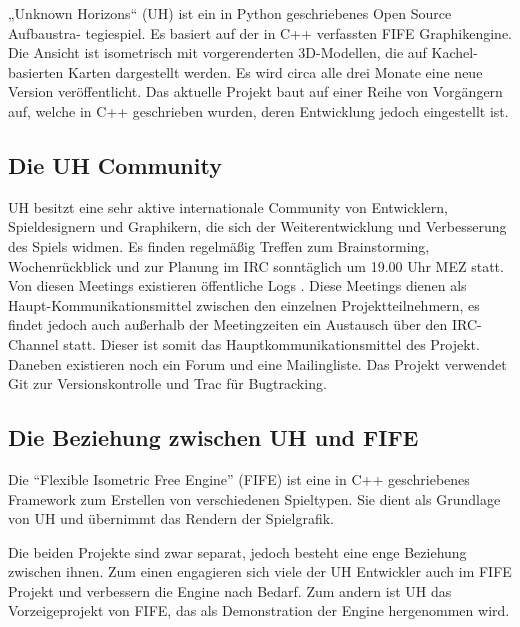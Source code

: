 „Unknown Horizons“ (UH) \cite{uh} ist ein in Python geschriebenes Open Source Aufbaustra-
tegiespiel. Es basiert auf der in C++
verfassten FIFE Graphikengine. Die Ansicht ist isometrisch mit vorgerenderten 3D-Modellen,
die auf Kachel-basierten Karten dargestellt werden. Es wird circa alle drei Monate eine neue Version
veröffentlicht. Das aktuelle Projekt baut auf einer Reihe von Vorgängern auf, welche
in C++ geschrieben wurden, deren Entwicklung jedoch eingestellt ist.

\subsection{Die UH Community}
UH besitzt eine sehr aktive internationale Community von Entwicklern, Spieldesignern und Graphikern, die
sich der Weiterentwicklung und Verbesserung des Spiels widmen.
Es finden regelmäßig Treffen zum Brainstorming, Wochenrückblick
und zur Planung im IRC sonntäglich um 19.00 Uhr MEZ statt. Von diesen Meetings existieren
öffentliche Logs \cite{uhlogs}.
Diese Meetings dienen als Haupt-Kommunikationsmittel zwischen den einzelnen Projektteilnehmern,
es findet jedoch auch außerhalb der Meetingzeiten ein Austausch über den  IRC-Channel statt.
Dieser ist somit das
Hauptkommunikationsmittel des Projekt. Daneben existieren noch ein Forum
und eine Mailingliste. Das Projekt verwendet Git zur Versionskontrolle und Trac für
Bugtracking.

\subsection{Die Beziehung zwischen UH und FIFE}
Die \enquote{Flexible Isometric Free Engine} (FIFE) \cite{fife} ist eine in C++ geschriebenes Framework
zum Erstellen von verschiedenen Spieltypen. Sie dient als Grundlage von UH und übernimmt das Rendern
der Spielgrafik.

Die beiden Projekte sind zwar separat, jedoch besteht eine enge Beziehung zwischen ihnen. Zum einen
engagieren sich viele der UH Entwickler auch im FIFE Projekt und verbessern die Engine nach Bedarf.
Zum andern ist UH das Vorzeigeprojekt von FIFE, das als Demonstration der Engine hergenommen wird.

